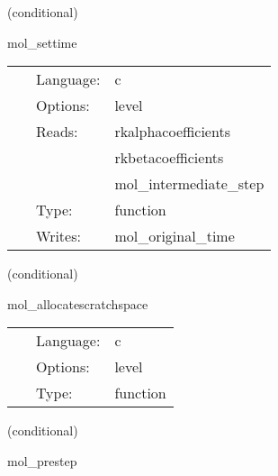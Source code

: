 \vspace{5mm}

   (conditional) 

\hspace{5mm} mol\_settime 

\hspace{5mm}{\it ensure the correct time and timestep are used } 


\hspace{5mm}

 \begin{tabular*}{160mm}{cll} 
~ & Language:  & c \\ 
~ & Options:  & level \\ 
~ & Reads:  & rkalphacoefficients \\ 
~& ~ &rkbetacoefficients\\ 
~& ~ &mol\_intermediate\_step\\ 
~ & Type:  & function \\ 
~ & Writes:  & mol\_original\_time \\ 
\end{tabular*} 


\vspace{5mm}

   (conditional) 

\hspace{5mm} mol\_allocatescratchspace 

\hspace{5mm}{\it allocate storage for scratch levels } 


\hspace{5mm}

 \begin{tabular*}{160mm}{cll} 
~ & Language:  & c \\ 
~ & Options:  & level \\ 
~ & Type:  & function \\ 
\end{tabular*} 


\vspace{5mm}

   (conditional) 

\hspace{5mm} mol\_prestep 

\hspace{5mm}{\it physics thorns can schedule preloop setup routines in here } 


\hspace{5mm}

